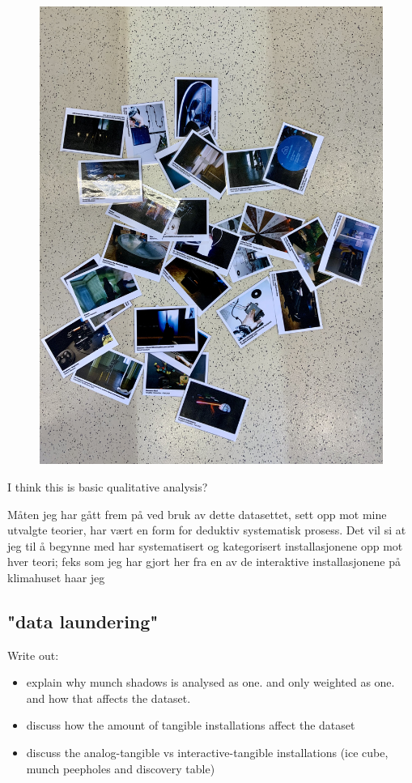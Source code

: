 \begin{figure}[H]
\includegraphics[width=12cm]{pictures/dataset/datasett_oversikt.jpeg}
\centering 
\end{figure}

I think this is basic qualitative analysis?

Måten jeg har gått frem på ved bruk av dette datasettet, sett opp mot mine utvalgte teorier, har vært en form for deduktiv systematisk prosess. Det vil si at jeg til å begynne med har systematisert og kategorisert installasjonene opp mot hver teori; feks som jeg har gjort her fra en av de interaktive installasjonene på klimahuset haar jeg

\subsection{"data laundering"}
Write out:
\begin{itemize}
    \item explain why munch shadows is analysed as one. and only weighted as one. and how that affects the dataset.
    \item discuss how the amount of tangible installations affect the dataset
    \item discuss the analog-tangible vs interactive-tangible installations (ice cube, munch peepholes and discovery table)
\end{itemize}

